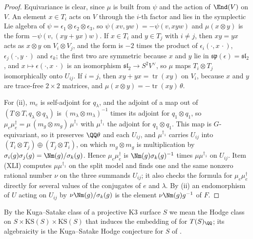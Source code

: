 \begin{proof}
Equivariance is clear, since $\mu$ is built from $\psi$ and the action of
$\End(V)$ on $V$. An element $x\in T_{i}$ acts on $V$ through the $i$-th factor
and lies in the symplectic Lie algebra of $\psi=\epsilon_{1}\otimes
\epsilon_{2}\otimes\epsilon_{3}$, so $\psi(xv,yw)=-\psi(v,xyw)$ and
$\mu(x\otimes y)$ is the form $-\psi(v,(xy+yx)w)$. If $x\in T_{i}$ and
$y\in T_{j}$ with $i\ne j$, then $xy=yx$ acts as $x\otimes y$ on
$V_{i}\otimes V_{j}$, and the form is $-2$ times the product of
$\epsilon_{i}(\cdot,x\,\cdot)$, $\epsilon_{j}(\cdot,y\,\cdot)$ and
$\epsilon_{k}$; the first two are symmetric because $x$ and $y$ lie in
$\mathfrak{sp}(\epsilon)=\mathfrak{sl}_{2}$, and $x\mapsto\epsilon(\cdot,x\,\cdot)$
is an isomorphism $\mathfrak{sl}_{2}\to S^{2}V^{\vee}$, so $\mu$ maps
$T_{i}\otimes T_{j}$ isomorphically onto $U_{ij}$. If $i=j$, then
$xy+yx=\operatorname{tr}(xy)$ on $V_{i}$, because $x$ and $y$ are trace-free
$2\times2$ matrices, and $\mu(x\otimes y)=-\operatorname{tr}(xy)\,\theta$.

For (ii), $m_{e}$ is self-adjoint for $q_{\lambda}$, and the adjoint of a
map out of $(T\otimes T,q_{\lambda}\otimes q_{\lambda})$ is
$(m_{\lambda}\otimes m_{\lambda})^{-1}$ times its adjoint for
$q_{1}\otimes q_{1}$, so
$\mu_{e}\mu_{e}^{\dagger}=\mu\,(m_{g}\otimes m_{g})\,\mu^{\dagger_{1}}$ with
$\mu^{\dagger_{1}}$ the adjoint for $q_{1}\otimes q_{1}$. This map is
$G$-equivariant, so it preserves $\QQ\theta$ and each $U_{ij}$, and
$\mu^{\dagger_{1}}$ carries $U_{ij}$ into
$(T_{i}\otimes T_{j})\oplus(T_{j}\otimes T_{i})$, on which $m_{g}\otimes m_{g}$
is multiplication by $\sigma_{i}(g)\sigma_{j}(g)=\Nm(g)/\sigma_{k}(g)$. Hence
$\mu_{e}\mu_{e}^{\dagger}$ is $\Nm(g)\sigma_{k}(g)^{-1}$ times
$\mu\mu^{\dagger_{1}}$ on $U_{ij}$. Item (XLI) computes $\mu\mu^{\dagger_{1}}$
on the split model and finds one and the same nonzero rational number $\nu$
on the three summands $U_{ij}$; it also checks the formula for
$\mu_{e}\mu_{e}^{\dagger}$ directly for several values of the conjugates of
$e$ and $\lambda$. By (ii) an endomorphism of $U$ acting
on $U_{ij}$ by $\nu\Nm(g)/\sigma_{k}(g)$ is the element $\nu\Nm(g)g^{-1}$ of
$F$.
\end{proof}

By the Kuga--Satake class of a projective K3 surface $S$ we mean the Hodge
class on $S\times\mathrm{KS}(S)\times\mathrm{KS}(S)$ that induces the embedding
of  for $T(S)_{\QQ}$; its algebraicity is the Kuga--Satake
Hodge conjecture for $S$ of .

